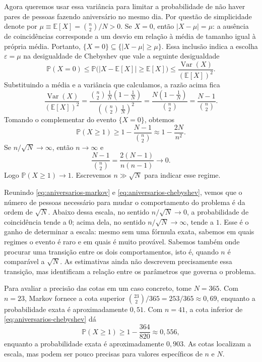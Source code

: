 \documentclass[12pt,portuguese]{article}
\theoremstyle{definition}
\theoremstyle{plainexercise}
\theoremstyle{starredexercise}
\theoremstyle{definition}
\begin{document}
Agora queremos usar essa variância para limitar a probabilidade de não
haver pares de pessoas fazendo aniversário no mesmo dia.
Por questão de simplicidade denote por $\mu\equiv \mathbb{E}[X]=\binom n2/N>0$.
Se $X=0$, então $|X-\mu|=\mu$: a ausência de coincidências corresponde
a um desvio em relação à média de tamanho igual à própria média. Portanto,
$\{X=0\}\subseteq\{|X-\mu|\geqslant\mu\}$. Essa inclusão indica a
escolha $\varepsilon=\mu$ na desigualdade de Chebyshev que vale a seguinte desigualdade
\[
\mathbb{P}(X=0)
\leqslant
\mathbb{P}\bigl(|X-\mathbb{E}[X]|\geqslant\mathbb{E}[X]\bigr)
\leqslant
\frac{\operatorname{Var}(X)}{(\mathbb{E}[X])^2}.
\]
Substituindo a média e a variância que calculamos, a razão acima fica
\[
\frac{\operatorname{Var}(X)}{(\mathbb{E}[X])^2}
=\frac{\binom n2\,\frac1N\left(1-\frac1N\right)}
       {\left(\binom n2\,\frac1N\right)^2}
=\frac{N\left(1-\frac1N\right)}{\binom n2}
=\frac{N-1}{\binom n2}.
\]
Tomando o complementar do evento $\{X=0\}$, obtemos
\begin{equation}\label{eq:aniversarios-chebyshev}
\mathbb{P}(X\geqslant1)\geqslant1-\frac{N-1}{\binom{n}{2}}
\approx1-\frac{2N}{n^2}.
\end{equation}
Se $n/\sqrt N\to\infty$, então $n\to\infty$ e
\[
\frac{N-1}{\binom n2}
=\frac{2(N-1)}{n(n-1)}
\longrightarrow0.
\]
Logo $\mathbb{P}(X\geqslant1)\to1$. Escrevemos $n\gg\sqrt N$ para
indicar esse regime.

Reunindo \eqref{eq:aniversarios-markov} e \eqref{eq:aniversarios-chebyshev},
vemos que o número de pessoas necessário para mudar o comportamento do
problema é da ordem de $\sqrt N$. Abaixo dessa escala, no sentido
$n/\sqrt N\to0$, a probabilidade de coincidência tende a $0$; acima dela,
no sentido $n/\sqrt N\to\infty$, tende a $1$. Esse é o ganho de determinar
a escala: mesmo sem uma fórmula exata, sabemos em quais regimes o evento é
raro e em quais é muito provável. Sabemos também onde procurar uma
transição entre os dois comportamentos, isto é, quando $n$ é comparável a
$\sqrt N$. As estimativas ainda não descrevem precisamente essa transição,
mas identificam a relação entre os parâmetros que governa o problema.

\bigskip


Para avaliar a precisão das cotas em um caso concreto, tome $N=365$.
Com $n=23$, Markov fornece a cota superior
$\binom{23}{2}/365=253/365\approx0{,}69$, enquanto a probabilidade exata é
aproximadamente $0{,}51$. Com $n=41$, a cota inferior de
\eqref{eq:aniversarios-chebyshev}
dá
\[
\mathbb{P}(X\geqslant1)\geqslant1-\frac{364}{820}\approx0{,}556,
\]
enquanto a probabilidade exata é aproximadamente $0{,}903$. As cotas
localizam a escala, mas podem ser pouco precisas para valores específicos
de $n$ e $N$.
\end{document}
